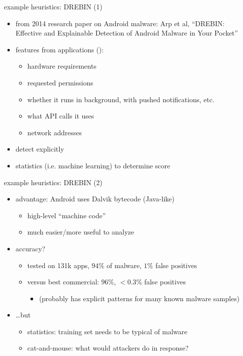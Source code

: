 \begin{frame}{example heuristics: DREBIN (1)}
    \begin{itemize}
    \item {\small from 2014 research paper on Android malware: Arp et al, ``DREBIN: Effective and Explainable Detection of Android Malware in Your Pocket''}
    \item features from applications ():
        \begin{itemize}
        \item hardware requirements
        \item requested permissions
        \item whether it runs in background, with pushed notifications, etc.
        \item what API calls it uses
        \item network addresses
        \end{itemize}
    \item detect  explicitly
    \item statistics (i.e. machine learning) to determine score
    \end{itemize}
\end{frame}

\begin{frame}{example heuristics: DREBIN (2)}
    \begin{itemize}
    \item advantage: Android uses Dalvik bytecode (Java-like)
        \begin{itemize}
        \item high-level ``machine code''
        \item much easier/more useful to analyze
        \end{itemize}
    \item accuracy?
        \begin{itemize}
        \item tested on 131k apps, $94$\% of malware, $1$\% false positives
        \item versus best commercial: $96$\%, $<0.3$\% false positives
            \begin{itemize}
            \item (probably has explicit patterns for many known malware samples)
            \end{itemize}
        \end{itemize}
    \item \ldots but
        \begin{itemize}
        \item statistics: training set needs to be typical of malware
        \item cat-and-mouse: what would attackers do in response?
        \end{itemize}
    \end{itemize}
\end{frame}
